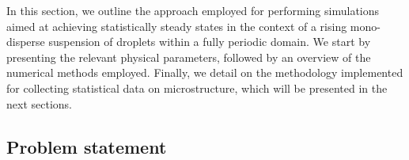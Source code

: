 In this section, we outline the approach employed for performing simulations aimed at achieving statistically steady states in the context of a rising mono-disperse suspension of droplets within a fully periodic domain.
We start by presenting the relevant physical parameters, followed by an overview of the numerical methods employed.
Finally, we detail on the methodology implemented for collecting statistical data on microstructure, which will be presented in the next sections.



\subsection{Problem statement}

